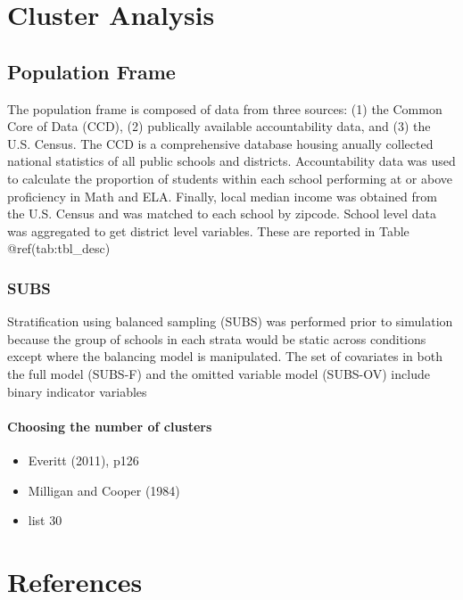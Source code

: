 \documentclass[floatsintext,man]{apa6}
\providecommand{\tightlist}{%
  \setlength{\itemsep}{0pt}\setlength{\parskip}{0pt}}
\theoremstyle{definition}
\theoremstyle{definition}
\theoremstyle{definition}
\theoremstyle{remark}
\begin{document}
\section{Cluster Analysis}\label{cluster-analysis}

\subsection{Population Frame}\label{population-frame}

The population frame is composed of data from three sources: (1) the
Common Core of Data (CCD), (2) publically available accountability data,
and (3) the U.S. Census. The CCD is a comprehensive database housing
anually collected national statistics of all public schools and
districts. Accountability data was used to calculate the proportion of
students within each school performing at or above proficiency in Math
and ELA. Finally, local median income was obtained from the U.S. Census
and was matched to each school by zipcode. School level data was
aggregated to get district level variables. These are reported in Table
@ref(tab:tbl\_desc)

\subsubsection{SUBS}\label{subs}

Stratification using balanced sampling (SUBS) was performed prior to
simulation because the group of schools in each strata would be static
across conditions except where the balancing model is manipulated. The
set of covariates in both the full model (SUBS-F) and the omitted
variable model (SUBS-OV) include binary indicator variables

\paragraph{Choosing the number of
clusters}\label{choosing-the-number-of-clusters}

\begin{itemize}
\tightlist
\item
  Everitt (2011), p126
\item
  Milligan and Cooper (1984)
\item
  list 30
\end{itemize}

\newpage

\section{References}\label{references}

\begingroup
\setlength{\parindent}{-0.5in} \setlength{\leftskip}{0.5in}

\hypertarget{refs}{}

\endgroup
\end{document}
